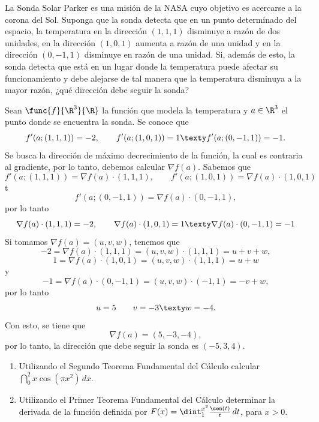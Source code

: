 \documentclass[10pt,respuestas,a4]{aleph-examen}
\begin{document}
\encabezado

\begin{preguntas}
\item
    La Sonda Solar Parker es una misión de la NASA cuyo objetivo es acercarse a la corona del Sol. Suponga que la sonda detecta que en un punto determinado del espacio, la temperatura en la dirección $(1,1,1)$ disminuye a razón de dos unidades, en la dirección $(1,0,1)$ aumenta a razón de una unidad y en la dirección $(0,-1,1)$ disminuye en razón de una unidad. Si, además de esto, la sonda detecta que está en un lugar donde la temperatura puede afectar su funcionamiento y debe alejarse de tal manera que la temperatura disminuya a la mayor razón, ¿qué dirección debe seguir la sonda?

\begin{respuesta}
    Sean $\func{f}{\R^3}{\R}$ la función que modela la temperatura y $a\in\R^3$ el punto donde se encuentra la sonda. Se conoce que
    \[
        f'(a;(1,1,1)) = -2,
        \qquad
        f'(a;(1,0,1)) = 1
        \texty
        f'(a;(0,-1,1)) = -1.
    \]
    Se busca la dirección de máximo decrecimiento de la función, la cual es contraria al gradiente, por lo tanto, debemos calcular $\nabla f(a)$. Sabemos que
    \[
        f'(a;(1,1,1)) = \nabla f(a) \cdot (1,1,1),
        \qquad
        f'(a;(1,0,1)) = \nabla f(a) \cdot (1,0,1)
    \]
    t
    \[
        f'(a;(0,-1,1)) = \nabla f(a) \cdot (0,-1,1),
    \]
    por lo tanto
    \[
        \nabla f(a) \cdot (1,1,1) = -2,
        \qquad
        \nabla f(a) \cdot (1,0,1) = 1
        \texty
        \nabla f(a) \cdot (0,-1,1) = -1
    \]
    Si tomamos $\nabla f(a) = (u,v,w)$, tenemos que
    \[
        -2 = \nabla f(a) \cdot (1,1,1) = (u,v,w) \cdot (1,1,1) = u + v + w,
    \]
    \[
        1 = \nabla f(a) \cdot (1,0,1) = (u,v,w) \cdot (1,1,1) = u + w
    \]
    y
    \[
        -1 = \nabla f(a) \cdot (0,-1,1) = (u,v,w) \cdot (-1,1) = -v + w,
    \]
    por lo tanto
    \[
        u = 5
        \qquad
        v = -3
        \texty
        w = -4.
    \]
    Con esto, se tiene que 
    \[
        \nabla f(a) = (5,-3,-4),
    \]
    por lo tanto, la dirección que debe seguir la sonda es $(-5,3,4)$.
\end{respuesta}


\item
    \begin{enumerate}
    \item 
        Utilizando el Segundo Teorema Fundamental del Cálculo calcular $\dint_0^2 x\cos(\pi x^2)\,dx$.
    \item
        Utilizando el Primer Teorema Fundamental del Cálculo determinar la derivada de la función definida por $F(x)= \dint_1^{x^2} \frac{\sen(t)}{t} \,dt$, para $x>0$.
    \end{enumerate}


\end{preguntas}
\end{document}
